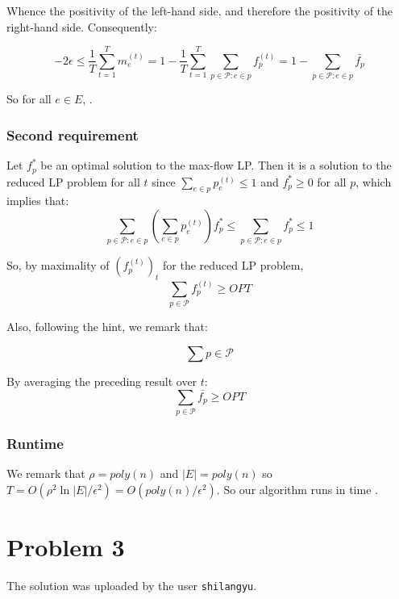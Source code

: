 \documentclass[a4paper, 11pt]{article}
\begin{document}
Whence the positivity of the left-hand side, and therefore the positivity of the right-hand side. Consequently:

$$-2\epsilon \le \frac{1}{T}\sum_{t = 1}^{T}m_e^{(t)} = 1 - \frac{1}{T}\sum_{t=1}^{T}\sum_{p \in \mathcal{P} : e \in p}f_p^{(t)} = 1 - \sum_{p \in \mathcal{P}:e \in p}\bar{f_p}$$

So for all $e \in E$, .

\subsubsection*{Second requirement}

Let $f_p^*$ be an optimal solution to the max-flow LP. Then it is a solution to the reduced LP problem for all $t$ since $\sum_{e \in p} p_e^{(t)} \le 1$ and $f_p^* \ge 0$ for all $p$, which implies that:
$$\sum_{p\in \mathcal{P}:e\in p}\left(\sum_{e \in p} p_e^{(t)}\right)f_p^* \le \sum_{p \in \mathcal{P} : e\in p} f_p^* \le 1$$

So, by maximality of $(f_p^{(t)})_t$ for the reduced LP problem,
$$\sum_{p \in \mathcal{P}}f_p^{(t)} \ge OPT$$

Also, following the hint, we remark that:

$$
\sum{p \in \mathcal{P}}
$$

By averaging the preceding result over $t$:
$$\boxed{\sum_{p \in \mathcal{P}}\bar{f_p} \ge OPT}$$

\subsubsection*{Runtime}


We remark that $\rho = poly(n)$ and $|E|=poly(n)$ so $T = O(\rho^2\ln{|E|}/\epsilon^2) = O(poly(n)/\epsilon^2)$. So our algorithm runs in time .

\newpage

\section*{Problem 3}

The solution was uploaded by the user \texttt{shilangyu}.
\end{document}
